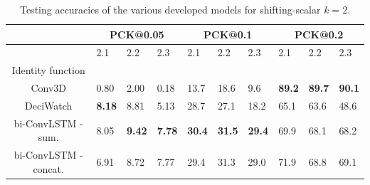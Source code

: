 \documentclass[./main.tex]{subfiles}
\begin{document}
\begin{table}[htbp]
    \begin{tabular}{c||lll|lll|lll}
        \hline
        & \multicolumn{3}{c}{PCK@0.05} & \multicolumn{3}{c}{PCK@0.1} & \multicolumn{3}{c}{PCK@0.2} \\
        \hline
        & 2.1 & 2.2 & 2.3 & 2.1 & 2.2 & 2.3 & 2.1 & 2.2 & 2.3 \\
        \hline
        Identity function & & & & & & & & & \\
        Conv3D & 0.80 & 2.00 & 0.18 & 13.7 & 18.6 & 9.6 & \textbf{89.2} & \textbf{89.7} & \textbf{90.1} \\
        DeciWatch & \textbf{8.18} & 8.81 & 5.13 & 28.7 & 27.1 & 18.2 & 65.1 & 63.6 & 48.6 \\
        bi-ConvLSTM - sum. & 8.05 & \textbf{9.42} & \textbf{7.78} & \textbf{30.4} & \textbf{31.5} & \textbf{29.4} & 69.9 & 68.1 & 68.2 \\
        bi-ConvLSTM - concat. & 6.91 & 8.72 & 7.77 & 29.4 & 31.3 & 29.0 & 71.9 & 68.8 & 69.1 \\
        \hline
    \end{tabular}
    \label{tab:pretrain_test_accs_2}
    \caption{Testing accuracies of the various developed models for shifting-scalar $k = 2$.}
\end{table}
\end{document}
